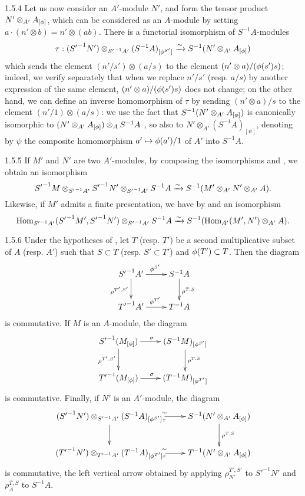 \begin{env}{1.5.4}
\label{env-0.1.5.4}
Let us now consider an $A'$-module $N'$, and form the tensor product
$N'\otimes_{A'}A_{[\phi]}$, which can be considered as an $A$-module by setting
$a\cdot(n'\otimes b)=n'\otimes(ab)$. There is a functorial isomorphism of $S^{-1}A$-modules
\[
  \tau:({S'}^{-1}N')\otimes_{{S'}^{-1}A'}(S^{-1}A)_{[\phi^{S'}]}
  \xrightarrow{\sim} S^{-1}(N'\otimes_{A'}A_{[\phi]})
\]
which sends the element $(n'/s')\otimes(a/s)$ to the element $(n'\otimes a)/(\phi(s')s)$;
indeed, we verify separately that when we replace $n'/s'$ (resp. $a/s$) by another expression
of the same element, $(n'\otimes a)/(\phi(s')s)$ does not change; on the other hand, we can
define an inverse homomorphism of $\tau$ by sending $(n'\otimes a)/s$ to the element
$(n'/1)\otimes(a/s)$: we use the fact that $S^{-1}(N'\otimes_{A'}A_{[\phi]})$ is canonically
isomorphic to $(N'\otimes_{A'}A_{[\phi]})\otimes_A S^{-1}A$ , so also to
$N'\otimes_{A'}(S^{-1}A)_{[\psi]}$, denoting by $\psi$ the composite homomorphism
$a'\mapsto\phi(a')/1$ of $A'$ into $S^{-1}A$.
\end{env}

\begin{env}{1.5.5}
\label{env-0.1.5.5}
If $M'$ and $N'$ are two $A'$-modules, by composing the isomorphisms  and
, we obtain an isomorphism
\[
  {S'}^{-1}M\otimes_{{S'}^{-1}A'}{S'}^{-1}N'\otimes_{{S'}^{-1}A'}S^{-1}A
  \xrightarrow{\sim} S^{-1}(M'\otimes_{A'}N'\otimes_{A'}A).
\]
Likewise, if $M'$ admits a finite presentation, we have by  and
 an isomorphism
\[
  {\mathop{\mathrm{Hom}}\nolimits}_{{S'}^{-1}A'}({S'}^{-1}M',{S'}^{-1}N')\otimes_{{S'}^{-1}A'}S^{-1}A
  \xrightarrow{\sim} S^{-1}({\mathop{\mathrm{Hom}}\nolimits}_{A'}(M',N')\otimes_{A'}A).
\]
\end{env}

\begin{env}{1.5.6}
\label{env-0.1.5.6}
Under the hypotheses of , let $T$ (resp. $T'$) be a second multiplicative
subset of $A$ (resp. $A'$) such that $S\subset T$ (resp. $S'\subset T'$) and
$\phi(T')\subset T$. Then the diagram
\[
  \xymatrix{
    {S'}^{-1}A'\ar[r]^{\vphi^{S'}}\ar[d]_{\rho^{T',S'}} & S^{-1}A\ar[d]^{\rho^{T,S}}\\
    {T'}^{-1}A'\ar[r]^{\vphi^{T'}} & T^{-1}A
  }
\]
is commutative. If $M$ is an $A$-module, the diagram
\[
  \xymatrix{
    {S'}^{-1}(M_{[\vphi]})\ar[r]^\sigma\ar[d]_{\rho^{T',S'}} &
    (S^{-1}M)_{[\vphi^{S'}]}\ar[d]^{\rho^{T,S}}\\
    {T'}^{-1}(M_{[\vphi]})\ar[r]^\sigma & (T^{-1}M)_{[\vphi^{T'}]}
  }
\]
is commutative. Finally, if $N'$ is an $A'$-module, the diagram
\[
  \xymatrix{
    ({S'}^{-1}N')\otimes_{{S'}^{-1}A'}(S^{-1}A)_{[\vphi^{S'}]}\ar[r]^\sim_\tau\ar[d] &
    S^{-1}(N'\otimes_{A'}A_{[\vphi]})\ar[d]^{\rho^{T,S}}\\
    ({T'}^{-1}N')\otimes_{{T'}^{-1}A'}(T^{-1}A)_{[\vphi^{T'}]}
    \ar[r]^\sim_\tau & T^{-1}(N'\otimes_{A'}A_{[\vphi]})
  }
\]
is commutative, the left vertical arrow obtained by applying
$\rho_{N'}^{T',S'}$ to ${S'}^{-1}N'$ and $\rho_A^{T,S}$ to $S^{-1}A$.
\end{env}

